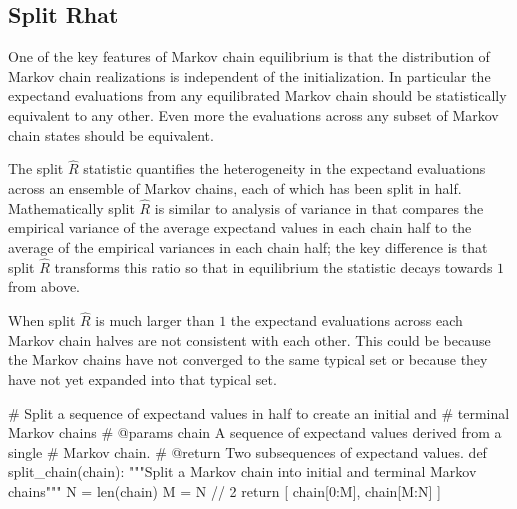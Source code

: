 \documentclass[
  letterpaper,
  DIV=11,
  numbers=noendperiod]{scrartcl}
\newenvironment{Shaded}{\begin{snugshade}}{\end{snugshade}}
\newcommand{\BuiltInTok}[1]{\textcolor[rgb]{0.00,0.23,0.31}{#1}}
\newcommand{\CommentTok}[1]{\textcolor[rgb]{0.37,0.37,0.37}{#1}}
\newcommand{\ControlFlowTok}[1]{\textcolor[rgb]{0.00,0.23,0.31}{#1}}
\newcommand{\DecValTok}[1]{\textcolor[rgb]{0.68,0.00,0.00}{#1}}
\newcommand{\KeywordTok}[1]{\textcolor[rgb]{0.00,0.23,0.31}{#1}}
\newcommand{\NormalTok}[1]{\textcolor[rgb]{0.00,0.23,0.31}{#1}}
\newcommand{\OperatorTok}[1]{\textcolor[rgb]{0.37,0.37,0.37}{#1}}
\begin{document}
\subsection{Split Rhat}\label{split-rhat}

One of the key features of Markov chain equilibrium is that the
distribution of Markov chain realizations is independent of the
initialization. In particular the expectand evaluations from any
equilibrated Markov chain should be statistically equivalent to any
other. Even more the evaluations across any subset of Markov chain
states should be equivalent.

The split \(\hat{R}\) statistic quantifies the heterogeneity in the
expectand evaluations across an ensemble of Markov chains, each of which
has been split in half. Mathematically split \(\hat{R}\) is similar to
analysis of variance in that compares the empirical variance of the
average expectand values in each chain half to the average of the
empirical variances in each chain half; the key difference is that split
\(\hat{R}\) transforms this ratio so that in equilibrium the statistic
decays towards \(1\) from above.

When split \(\hat{R}\) is much larger than \(1\) the expectand
evaluations across each Markov chain halves are not consistent with each
other. This could be because the Markov chains have not converged to the
same typical set or because they have not yet expanded into that typical
set.

\begin{Shaded}
\begin{Highlighting}[]
\CommentTok{\# Split a sequence of expectand values in half to create an initial and}
\CommentTok{\# terminal Markov chains}
\CommentTok{\# @params chain A sequence of expectand values derived from a single}
\CommentTok{\#               Markov chain.}
\CommentTok{\# @return Two subsequences of expectand values.}
\KeywordTok{def}\NormalTok{ split\_chain(chain):}
  \CommentTok{"""Split a Markov chain into initial and terminal Markov chains"""}
\NormalTok{  N }\OperatorTok{=} \BuiltInTok{len}\NormalTok{(chain)}
\NormalTok{  M }\OperatorTok{=}\NormalTok{ N }\OperatorTok{//} \DecValTok{2}
  \ControlFlowTok{return}\NormalTok{ [ chain[}\DecValTok{0}\NormalTok{:M], chain[M:N] ]}
\end{Highlighting}
\end{Shaded}
\end{document}
